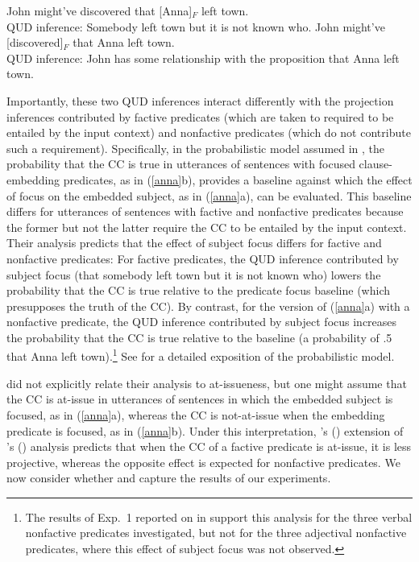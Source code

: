 \documentclass[11pt,fleqn]{article}
\newcommand{\6}{\mbox{$[\hspace*{-.6mm}[$}}
\newcommand{\9}{\mbox{$]\hspace*{-.6mm}]$}}
\newcommand{\citetpos}[1]{\citeauthor{#1}'s (\citeyear{#1})}
\begin{document}
\begin{exe}
\ex\label{anna} \citet[73]{djaerv-bacovcin2020}
\begin{xlist}
\ex John might've discovered that [Anna]$_F$ left town. \\ QUD inference: Somebody left town but it is not known who.
\ex John might've [discovered]$_F$ that Anna left town.  \\ QUD inference: John has some relationship with the proposition that Anna left town.
\end{xlist}
\end{exe}
Importantly, these two QUD inferences interact differently with the projection inferences contributed by factive predicates (which are taken to required to be entailed by the input context) and nonfactive predicates (which do not contribute such a requirement). Specifically, in the probabilistic model assumed in \citet[\S4]{djaerv-bacovcin2020}, the probability that the CC is true in utterances of sentences with focused clause-embedding predicates, as in (\ref{anna}b), provides a baseline against which the effect of focus on the embedded subject, as in (\ref{anna}a), can be evaluated. This baseline differs for utterances of sentences with factive and nonfactive predicates because the former but not the latter require the CC to be entailed by the input context. Their analysis predicts that the effect of subject focus differs for factive and nonfactive predicates: For factive predicates, the QUD inference contributed by subject focus (that somebody left town but it is not known who) lowers the probability that the CC is true relative to the predicate focus baseline (which presupposes the truth of the CC). By contrast, for the version of (\ref{anna}a) with a nonfactive predicate, the QUD inference contributed by subject focus increases the probability that the CC is true relative to the baseline (a probability of .5 that Anna left town).\footnote{The results of Exp.~1 reported on in \cite{djaerv-bacovcin2020} support this analysis for the three verbal nonfactive predicates investigated, but not for the three adjectival nonfactive predicates, where this effect of subject focus was not observed.} See \citet[\S4]{djaerv-bacovcin2020} for a detailed exposition of the probabilistic model.
 
\cite{djaerv-bacovcin2020} did not explicitly relate their analysis to at-issueness, but one might assume that the CC is at-issue in utterances of sentences in which the embedded subject is focused, as in (\ref{anna}a), whereas the CC is not-at-issue when the embedding predicate is focused, as in (\ref{anna}b). Under this interpretation,  \citetpos{djaerv-bacovcin2020} extension of \citetpos{heim83} analysis predicts that when the CC of a factive predicate is at-issue, it is less projective, whereas the opposite effect is expected for nonfactive predicates. We now consider whether \cite{heim83} and \cite{djaerv-bacovcin2020} capture the results of our experiments. 
\end{document}
